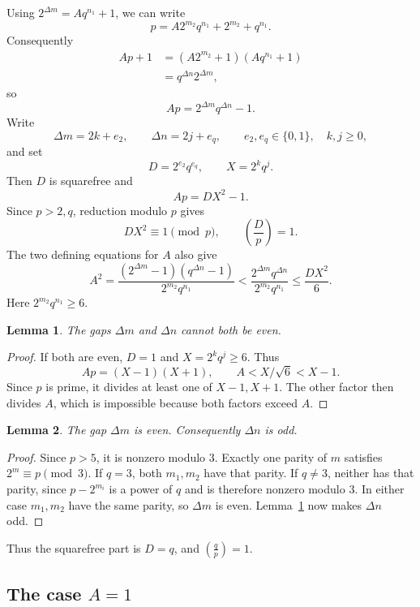 \documentclass[11pt]{article}
\newtheorem{lemma}{Lemma}
\begin{document}
Using $2^{\Delta m}=Aq^{n_1}+1$, we can write
\[
p=A2^{m_2}q^{n_1}+2^{m_2}+q^{n_1}.
\]
Consequently
\begin{align*}
Ap+1
 &= (A2^{m_2}+1)(Aq^{n_1}+1)\\
 &= q^{\Delta n}2^{\Delta m},
\end{align*}
so
\[
\boxed{Ap=2^{\Delta m}q^{\Delta n}-1.}
\]
Write
\[
\Delta m=2k+e_2,\qquad \Delta n=2j+e_q,
\qquad e_2,e_q\in\{0,1\},\quad k,j\geq0,
\]
and set
\[
D=2^{e_2}q^{e_q},\qquad X=2^kq^j.
\]
Then $D$ is squarefree and
\[
\boxed{Ap=DX^2-1.}
\]
Since $p>2,q$, reduction modulo $p$ gives
\[
DX^2\equiv1\pmod p,\qquad
\left(\frac{D}{p}\right)=1.
\]
The two defining equations for $A$ also give
\begin{equation}\label{eq:A-size}
A^2
 =\frac{(2^{\Delta m}-1)(q^{\Delta n}-1)}{2^{m_2}q^{n_1}}
 <\frac{2^{\Delta m}q^{\Delta n}}{2^{m_2}q^{n_1}}
 \leq\frac{DX^2}{6}.
\end{equation}
Here $2^{m_2}q^{n_1}\geq6$.

\begin{lemma}\label{lem:squares}
The gaps $\Delta m$ and $\Delta n$ cannot both be even.
\end{lemma}
\begin{proof}
If both are even, $D=1$ and $X=2^kq^j\geq6$. Thus
\[
Ap=(X-1)(X+1),\qquad A<X/\sqrt6<X-1.
\]
Since $p$ is prime, it divides at least one of $X-1,X+1$.
The other factor then divides $A$, which is impossible because both
factors exceed $A$.
\end{proof}

\begin{lemma}\label{lem:parity}
The gap $\Delta m$ is even. Consequently $\Delta n$ is odd.
\end{lemma}
\begin{proof}
Since $p>5$, it is nonzero modulo $3$. Exactly one parity of $m$
satisfies $2^m\equiv p\pmod3$.
If $q=3$, both $m_1,m_2$ have that parity.
If $q\neq3$, neither has that parity, since $p-2^{m_i}$ is a power
of $q$ and is therefore nonzero modulo $3$.
In either case $m_1,m_2$ have the same parity, so $\Delta m$ is even.
Lemma~\ref{lem:squares} now makes $\Delta n$ odd.
\end{proof}

Thus the squarefree part is $D=q$, and $\left(\frac{q}{p}\right)=1$.

\subsection{\texorpdfstring{The case $A=1$}{The case A=1}}
\end{document}

